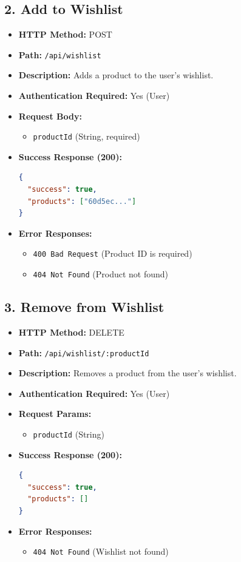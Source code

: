 \documentclass[12pt,a4paper]{article}
\begin{document}
\subsection{2. Add to Wishlist}
\begin{itemize}
    \item \textbf{HTTP Method:} POST
    \item \textbf{Path:} \texttt{/api/wishlist}
    \item \textbf{Description:} Adds a product to the user's wishlist.
    \item \textbf{Authentication Required:} Yes (User)
    \item \textbf{Request Body:}
    \begin{itemize}
        \item \texttt{productId} (String, required)
    \end{itemize}
    \item \textbf{Success Response (200):}
\begin{lstlisting}[language=json]
{
  "success": true,
  "products": ["60d5ec..."]
}
\end{lstlisting}
    \item \textbf{Error Responses:}
    \begin{itemize}
        \item \texttt{400 Bad Request} (Product ID is required)
        \item \texttt{404 Not Found} (Product not found)
    \end{itemize}
\end{itemize}

\subsection{3. Remove from Wishlist}
\begin{itemize}
    \item \textbf{HTTP Method:} DELETE
    \item \textbf{Path:} \texttt{/api/wishlist/:productId}
    \item \textbf{Description:} Removes a product from the user's wishlist.
    \item \textbf{Authentication Required:} Yes (User)
    \item \textbf{Request Params:}
    \begin{itemize}
        \item \texttt{productId} (String)
    \end{itemize}
    \item \textbf{Success Response (200):}
\begin{lstlisting}[language=json]
{
  "success": true,
  "products": []
}
\end{lstlisting}
    \item \textbf{Error Responses:}
    \begin{itemize}
        \item \texttt{404 Not Found} (Wishlist not found)
    \end{itemize}
\end{itemize}
\end{document}
